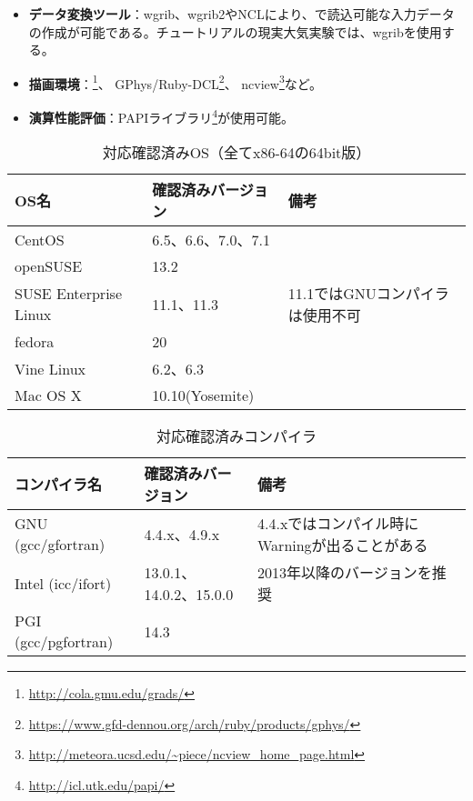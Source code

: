 \begin{itemize}
  \item {\bf データ変換ツール}：wgrib、wgrib2やNCLにより、\scalerm で読込可能な入力データの作成が可能である。チュートリアルの現実大気実験では、wgribを使用する。
  \item {\bf 描画環境}：\grads \footnote{\url{http://cola.gmu.edu/grads/}}、
GPhys/Ruby-DCL\footnote{\url{https://www.gfd-dennou.org/arch/ruby/products/gphys/}}、
ncview\footnote{\url{http://meteora.ucsd.edu/~piece/ncview\_home\_page.html}}など。
  \item {\bf 演算性能評価}：PAPIライブラリ\footnote{\url{http://icl.utk.edu/papi/}}が使用可能。
\end{itemize}


\begin{table}[htb]
\begin{center}
\caption{対応確認済みOS（全てx86-64の64bit版）}
\begin{tabularx}{150mm}{|l|l|X|} \hline
 \rowcolor[gray]{0.9} OS名 & 確認済みバージョン & 備考 \\ \hline
 CentOS                & 6.5、6.6、7.0、7.1 &  \\ \hline
 openSUSE              & 13.2               &  \\ \hline
 SUSE Enterprise Linux & 11.1、11.3         & 11.1ではGNUコンパイラは使用不可 \\ \hline
 fedora                & 20                 &  \\ \hline
 Vine Linux            & 6.2、6.3           &  \\ \hline
 Mac OS X              & 10.10(Yosemite)    &  \\ \hline
\end{tabularx}
\label{tab:compatible_os}
\end{center}
\end{table}

\begin{table}[htb]
\begin{center}
\caption{対応確認済みコンパイラ}
\begin{tabularx}{150mm}{|l|l|X|} \hline
 \rowcolor[gray]{0.9} コンパイラ名 & 確認済みバージョン & 備考 \\ \hline
 GNU (gcc/gfortran)    & 4.4.x、4.9.x           & 4.4.xではコンパイル時にWarningが出ることがある \\ \hline
 Intel (icc/ifort)     & 13.0.1、14.0.2、15.0.0 & 2013年以降のバージョンを推奨 \\ \hline
 PGI (gcc/pgfortran)   & 14.3                   &  \\ \hline
\end{tabularx}
\label{tab:compatible_compiler}
\end{center}
\end{table}

